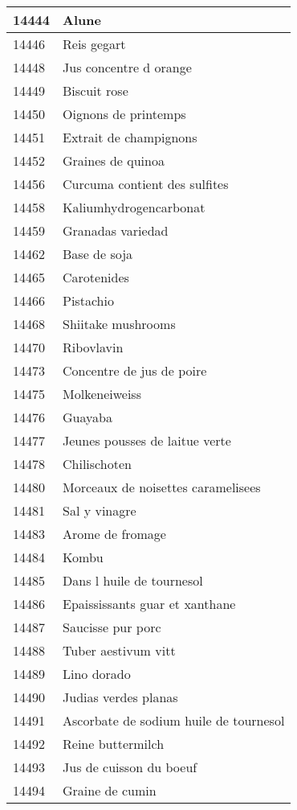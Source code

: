 \begin{longtable}{|l|l|}
14444 & Alune \\ \hline 
14446 & Reis gegart \\ \hline 
14448 & Jus concentre d orange \\ \hline 
14449 & Biscuit rose \\ \hline 
14450 & Oignons de printemps \\ \hline 
14451 & Extrait de champignons \\ \hline 
14452 & Graines de quinoa \\ \hline 
14456 & Curcuma contient des sulfites \\ \hline 
14458 & Kaliumhydrogencarbonat \\ \hline 
14459 & Granadas variedad \\ \hline 
14462 & Base de soja \\ \hline 
14465 & Carotenides \\ \hline 
14466 & Pistachio \\ \hline 
14468 & Shiitake mushrooms \\ \hline 
14470 & Ribovlavin \\ \hline 
14473 & Concentre de jus de poire \\ \hline 
14475 & Molkeneiweiss \\ \hline 
14476 & Guayaba \\ \hline 
14477 & Jeunes pousses de laitue verte \\ \hline 
14478 & Chilischoten \\ \hline 
14480 & Morceaux de noisettes caramelisees \\ \hline 
14481 & Sal y vinagre \\ \hline 
14483 & Arome de fromage \\ \hline 
14484 & Kombu \\ \hline 
14485 & Dans l huile de tournesol \\ \hline 
14486 & Epaississants guar et xanthane \\ \hline 
14487 & Saucisse pur porc \\ \hline 
14488 & Tuber aestivum vitt \\ \hline 
14489 & Lino dorado \\ \hline 
14490 & Judias verdes planas \\ \hline 
14491 & Ascorbate de sodium huile de tournesol \\ \hline 
14492 & Reine buttermilch \\ \hline 
14493 & Jus de cuisson du boeuf \\ \hline 
14494 & Graine de cumin \\ \hline 

\end{longtable}
